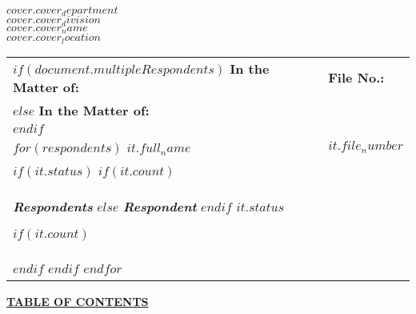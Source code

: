 \documentclass[12pt]{letter}
\begin{document}
\begin{letter}{}

\begin{center}
    \textbf{$cover.cover_department$} \\
    \textbf{$cover.cover_division$} \\
    \textbf{$cover.cover_name$} \\
    \textbf{$cover.cover_location$}
\end{center}

\renewcommand{\arraystretch}{1.2}  %

\vspace{2em}
\makebox[0.5\textwidth]{\hrulefill}
\begin{flushleft}
    \begin{tabular}{ p{} | p{} }
      
      $if(document.multipleRespondents)$
        \textbf{In the Matter of:} & \textbf{\hspace{1em}File No.:} \\
      $else$
        \textbf{In the Matter of:} \\
      $endif$ 

      \vspace{.0em} & \\ 

      $for(respondents)$
        \textbf{$it.full_name$} & \textbf{\hspace{1em}$it.file_number$} \\
        $if(it.status)$ 
          $if(it.count)$ 
            \vspace{.0em} & \\ 
            \textit{\textbf{Respondents}}
          $else$
            \textit{\textbf{Respondent}} 
          $endif$ 
          \textbf{$it.status$}

          $if(it.count)$ 
            \vspace{.25em} & \\
          $endif$
        $endif$    
      $endfor$

    \end{tabular}
\end{flushleft}
\makebox[0.5\textwidth]{\hrulefill}
 
\vspace{1em}

\fontsize{20}{22}\selectfont %

\begin{center}
    \underline{\textbf{TABLE OF CONTENTS}}
\end{center}


\end{letter}
\end{document}
